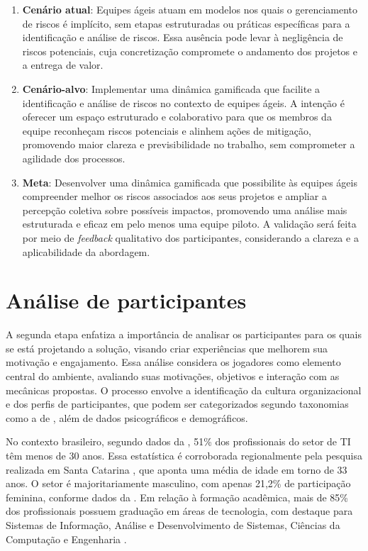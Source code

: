 \documentclass[
	12pt,
	openright,
	twoside,
	a4paper,
	english,
	brazil
	]{abntex2}
\begin{document}
\begin{enumerate}
  \item \textbf{Cenário atual}: Equipes ágeis atuam em modelos nos quais o gerenciamento de riscos é implícito, sem etapas estruturadas ou práticas específicas para a identificação e análise de riscos. Essa ausência pode levar à negligência de riscos potenciais, cuja concretização compromete o andamento dos projetos e a entrega de valor.
  
  \item \textbf{Cenário-alvo}: Implementar uma dinâmica gamificada que facilite a identificação e análise de riscos no contexto de equipes ágeis. A intenção é oferecer um espaço estruturado e colaborativo para que os membros da equipe reconheçam riscos potenciais e alinhem ações de mitigação, promovendo maior clareza e previsibilidade no trabalho, sem comprometer a agilidade dos processos.
  
  \item \textbf{Meta}: Desenvolver uma dinâmica gamificada que possibilite às equipes ágeis compreender melhor os riscos associados aos seus projetos e ampliar a percepção coletiva sobre possíveis impactos, promovendo uma análise mais estruturada e eficaz em pelo menos uma equipe piloto. A validação será feita por meio de \textit{feedback} qualitativo dos participantes, considerando a clareza e a aplicabilidade da abordagem.
\end{enumerate}

\section{Análise de participantes}

A segunda etapa enfatiza a importância de analisar os participantes para os quais se está projetando a solução, visando criar experiências que melhorem sua motivação e engajamento. Essa análise considera os jogadores como elemento central do ambiente, avaliando suas motivações, objetivos e interação com as mecânicas propostas. O processo envolve a identificação da cultura organizacional e dos perfis de participantes, que podem ser categorizados segundo taxonomias como a de , além de dados psicográficos e demográficos.

No contexto brasileiro, segundo dados da , 51\% dos profissionais do setor de TI têm menos de 30 anos. Essa estatística é corroborada regionalmente pela pesquisa realizada em Santa Catarina \cite{acate}, que aponta uma média de idade em torno de 33 anos. O setor é majoritariamente masculino, com apenas 21,2\% de participação feminina, conforme dados da . Em relação à formação acadêmica, mais de 85\% dos profissionais possuem graduação em áreas de tecnologia, com destaque para Sistemas de Informação, Análise e Desenvolvimento de Sistemas, Ciências da Computação e Engenharia \cite{revelo2021tecnologia}.
\end{document}
